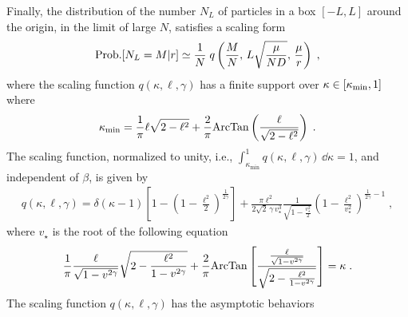 \documentclass[onecolumn,superscriptaddress,
 amsmath,amssymb,
 aps,
 prd,
]{revtex4-1}
\begin{document}
{\vspace{0.3cm}
Finally, the distribution of the number $N_L$ of particles in a box $[-L, L]$ around the origin, in the limit of large $N$, satisfies a scaling form
\begin{equation} \label{main-fcs}
{\rm Prob.}[N_L=M | r] \simeq \frac{1}{N} \; q\left(\frac{M}{N}, \, L \sqrt{\frac{\mu}{N D}}, \, \frac{\mu}{r} \right) \;,
\end{equation}
where the scaling function $q(\kappa, \ell, \gamma)$ has a finite support over $\kappa \in \left[ \kappa_{\rm min} , 1\right]$ where
\begin{equation} \label{main-zmin}
\kappa_{\rm min} = \frac{1}{\pi} \ell \sqrt{2 - \ell^2} + \frac{2}{\pi} {\rm ArcTan}\left( \frac{\ell}{\sqrt{2 - \ell^2}} \right) \;.
\end{equation}
The scaling function, normalized to unity, i.e., $\int_{\kappa_{\min}}^1 q(\kappa,\ell,\gamma)\, \dd \kappa = 1$, and independent of $\beta$, is given by
\begin{align} \label{eq:main-d}
q(\kappa, \ell, \gamma) = \delta(\kappa - 1) \left[1 - \left(1 - \frac{\ell^2}{2}\right)^{\frac{1}{2 \gamma}}\right] + \frac{\pi \ell^2}{2 \sqrt{2} \, \gamma \, v_{\star}^3} \frac{1}{\sqrt{1-\frac{v_{\star}^2}{2}}} \left(1 - \frac{\ell^2}{v_{\star}^2} \right)^{\frac{1}{2 \gamma}-1} \;,
\end{align}
where $v_\star$ is the root of the following equation
\begin{equation} \label{eq:main-v-eq}
\frac{1}{\pi}\frac{\ell}{\sqrt{1 - v^{2 \gamma}}} \sqrt{2 - \frac{\ell^2}{1 - v^{2 \gamma}}} + \frac{2}{\pi} {\rm ArcTan}\left[ \frac{\frac{\ell}{\sqrt{1 - v^{2 \gamma}}}}{\sqrt{2 - \frac{\ell^2}{1 - v^{2 \gamma}}}} \right] = \kappa\;.
\end{equation}
The scaling function $q(\kappa, \ell, \gamma)$ has the asymptotic behaviors
\begin{eqnarray} \label{eq:main-left-asymptotic-d}

\end{eqnarray}}
\end{document}
